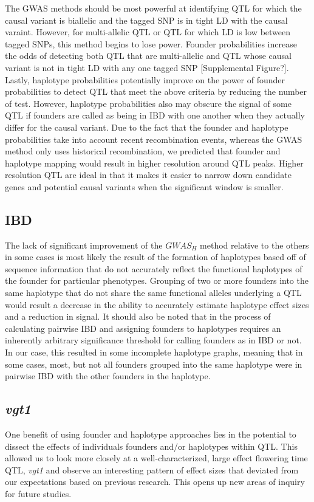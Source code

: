 \documentclass[article,9pt,twocolumn,twoside]{rilabRxiv}
\begin{document}
The GWAS methods should be most powerful at identifying QTL for which the causal variant is biallelic and the tagged SNP is in tight LD with the causal varaint. However, for multi-allelic QTL or QTL for which LD is low between tagged SNPs, this method begins to lose power. Founder probabilities increase the odds of detecting both QTL that are multi-allelic and QTL whose causal variant is not in tight LD with any one tagged SNP [Supplemental Figure?]. Lastly, haplotype probabilities potentially improve on the power of founder probabilities to detect QTL that meet the above criteria by reducing the number of test. However, haplotype probabilities also may obscure the signal of some QTL if founders are called as being in IBD with one another when they actually differ for the causal variant. Due to the fact that the founder and haplotype probabilities take into account recent recombination events, whereas the GWAS method only uses historical recombination, we predicted that founder and haplotype mapping would result in higher resolution around QTL peaks. Higher resolution QTL are ideal in that it makes it easier to narrow down candidate genes and potential causal variants when the significant window is smaller.

\subsection{IBD}
The lack of significant improvement of the $GWAS_H$ method relative to the others in some cases is most likely the result of the formation of haplotypes based off of sequence information that do not accurately reflect the functional haplotypes of the founder for particular phenotypes. Grouping of two or more founders into the same haplotype that do not share the same functional alleles underlying a QTL would result a decrease in the ability to accurately estimate haplotype effect sizes and a reduction in signal. It should also be noted that in the process of calculating pairwise IBD and assigning founders to haplotypes requires an inherently arbitrary significance threshold for calling founders as in IBD or not. In our case, this resulted in some incomplete haplotype graphs, meaning that in some cases, most, but not all founders grouped into the same haplotype were in pairwise IBD with the other founders in the haplotype.

\subsection{\emph{vgt1}}
One benefit of using founder and haplotype approaches lies in the potential to dissect the effects of individuals founders and/or haplotypes within QTL. This allowed us to look more closely at a well-characterized, large effect flowering time QTL, \emph{vgt1} and observe an interesting pattern of effect sizes that deviated from our expectations based on previous research. This opens up new areas of inquiry for future studies.
\end{document}
